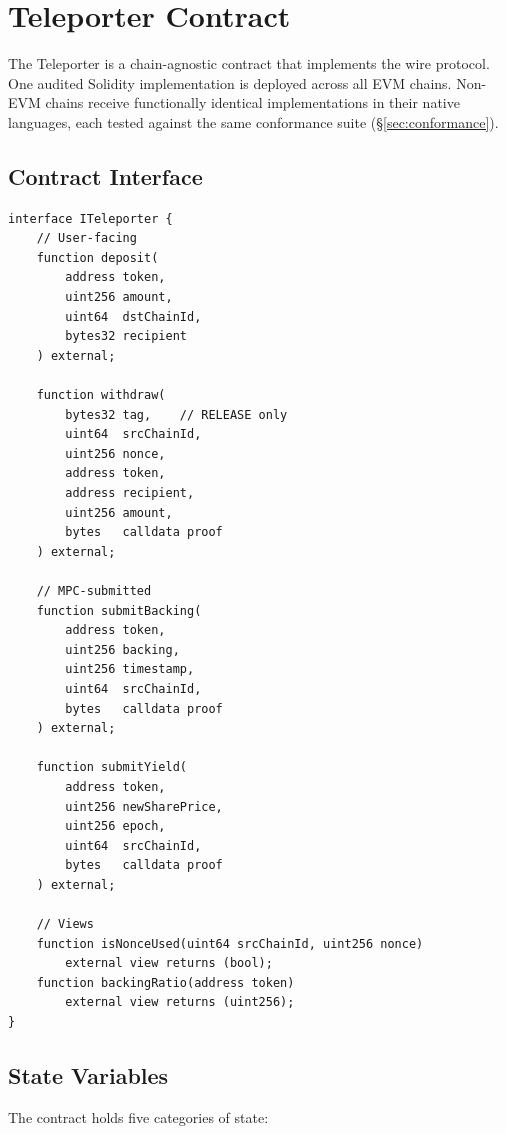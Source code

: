 \section{Teleporter Contract}

\label{sec:teleporter}

The Teleporter is a chain-agnostic contract that implements the wire protocol. One audited Solidity implementation is deployed across all EVM chains. Non-EVM chains receive functionally identical implementations in their native languages, each tested against the same conformance suite (\S\ref{sec:conformance}).

\subsection{Contract Interface}

\begin{lstlisting}[language=Solidity,caption={Core Teleporter interface (simplified)}]
interface ITeleporter {
    // User-facing
    function deposit(
        address token,
        uint256 amount,
        uint64  dstChainId,
        bytes32 recipient
    ) external;

    function withdraw(
        bytes32 tag,    // RELEASE only
        uint64  srcChainId,
        uint256 nonce,
        address token,
        address recipient,
        uint256 amount,
        bytes   calldata proof
    ) external;

    // MPC-submitted
    function submitBacking(
        address token,
        uint256 backing,
        uint256 timestamp,
        uint64  srcChainId,
        bytes   calldata proof
    ) external;

    function submitYield(
        address token,
        uint256 newSharePrice,
        uint256 epoch,
        uint64  srcChainId,
        bytes   calldata proof
    ) external;

    // Views
    function isNonceUsed(uint64 srcChainId, uint256 nonce)
        external view returns (bool);
    function backingRatio(address token)
        external view returns (uint256);
}
\end{lstlisting}

\subsection{State Variables}

The contract holds five categories of state:

